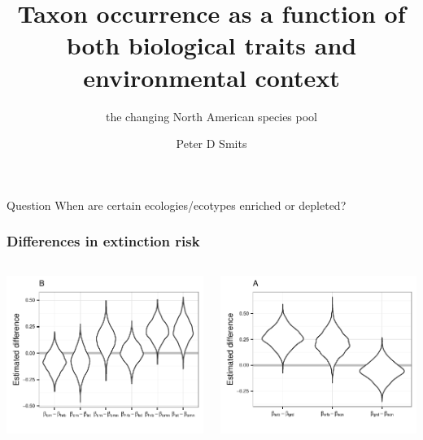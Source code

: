 \documentclass{beamer}
\title{Taxon occurrence as a function of both biological traits and environmental context}
\subtitle{the changing North American species pool}
\author{Peter D Smits}
\institute{Committee on Evolutionary Biology, University of Chicago}
\date{}
\begin{document}
\begin{frame}
  \maketitle
\end{frame}


\begin{frame}
  \begin{alertblock}{Question}
    When are certain ecologies/ecotypes enriched or depleted?
  \end{alertblock}
\end{frame}

\begin{frame}
  \frametitle{Differences in extinction risk}

  \begin{columns}
    \begin{column}{0.5\textwidth}
      \includegraphics[height=\textheight,width=\textwidth,keepaspectratio=true]{figure/diet_diff_est}
    \end{column}
    \begin{column}{0.5\textwidth}
      \includegraphics[height=\textheight,width=\textwidth,keepaspectratio=true]{figure/loco_diff_est}

\end{column}
\end{columns}
\end{frame}
\end{document}
